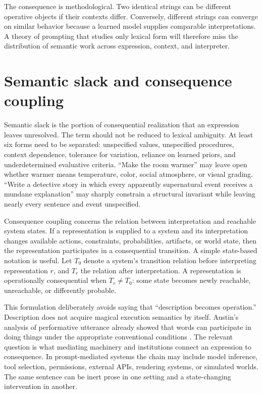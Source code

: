 \documentclass[11pt]{article}
\begin{document}
The consequence is methodological. Two identical strings can be different operative objects if their contexts differ. Conversely, different strings can converge on similar behavior because a learned model supplies comparable interpretations. A theory of prompting that studies only lexical form will therefore miss the distribution of semantic work across expression, context, and interpreter.

\section{Semantic slack and consequence coupling}

Semantic slack is the portion of consequential realization that an expression leaves unresolved. The term should not be reduced to lexical ambiguity. At least six forms need to be separated: unspecified values, unspecified procedures, context dependence, tolerance for variation, reliance on learned priors, and underdetermined evaluative criteria. ``Make the room warmer'' may leave open whether warmer means temperature, color, social atmosphere, or visual grading. ``Write a detective story in which every apparently supernatural event receives a mundane explanation'' may sharply constrain a structural invariant while leaving nearly every sentence and event unspecified.

Consequence coupling concerns the relation between interpretation and reachable system states. If a representation is supplied to a system and its interpretation changes available actions, constraints, probabilities, artifacts, or world state, then the representation participates in a consequential transition. A simple state-based notation is useful. Let $T_0$ denote a system's transition relation before interpreting representation $r$, and $T_r$ the relation after interpretation. A representation is operationally consequential when $T_r \neq T_0$: some state becomes newly reachable, unreachable, or differently probable.

This formulation deliberately avoids saying that ``description becomes operation.'' Description does not acquire magical execution semantics by itself. Austin's analysis of performative utterance already showed that words can participate in doing things under the appropriate conventional conditions \parencite{austin1962howtodo}. The relevant question is what mediating machinery and institutions connect an expression to consequence. In prompt-mediated systems the chain may include model inference, tool selection, permissions, external APIs, rendering systems, or simulated worlds. The same sentence can be inert prose in one setting and a state-changing intervention in another.
\end{document}
